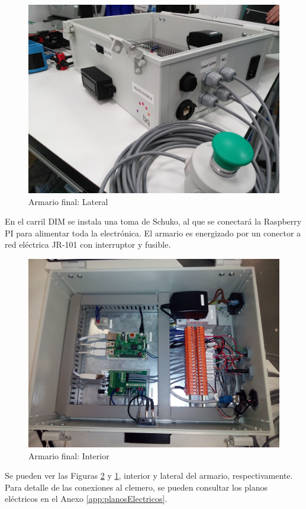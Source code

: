 \begin{figure}
\centering
\includegraphics[width=120mm]{Figures/lateralArmario}
\caption{Armario final: Lateral}
\label{fig:lateralArmario}
\end{figure}

En el carril DIM se instala una toma de Schuko, al que se conectará la Raspberry PI para alimentar toda la electrónica. El armario es energizado por un conector a red eléctrica JR-101 con interruptor y fusible.

\begin{figure}
\centering
\includegraphics[width=120mm]{Figures/interiorArmario}
\caption{Armario final: Interior}
\label{fig:interiorArmario}
\end{figure}

Se pueden ver las Figuras \ref{fig:interiorArmario} y \ref{fig:lateralArmario}, interior y lateral del armario, respectivamente. Para detalle de las conexiones al clemero, se pueden consultar los planos eléctricos en el Anexo \ref{app:planosElectricos}.

